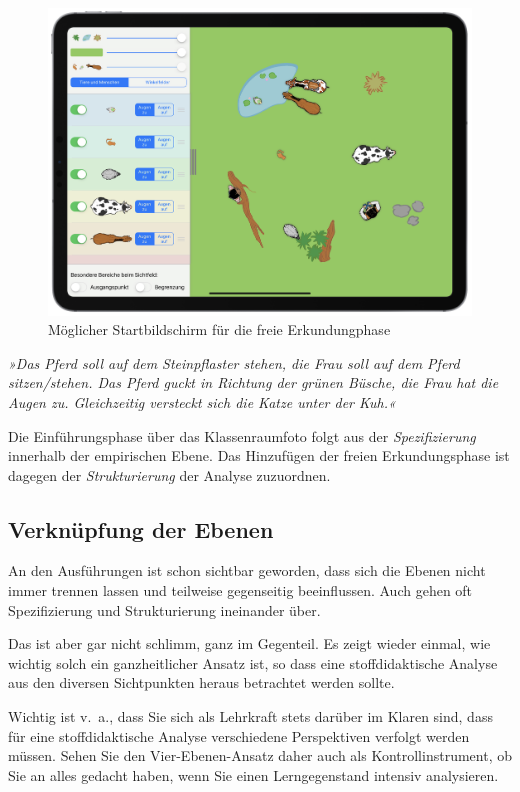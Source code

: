 \documentclass[
]{scrbook}
\theoremstyle{definition}
\theoremstyle{definition}
\theoremstyle{definition}
\theoremstyle{definition}
\theoremstyle{remark}
\begin{document}
\begin{figure}

{\centering \includegraphics[width=0.75\linewidth]{pictures/1-WinkelfarmStart} 

}

\caption{Möglicher Startbildschirm für die freie Erkundungphase}\label{fig:WinkelfarmStart}
\end{figure}

\emph{»Das Pferd soll auf dem Steinpflaster stehen, die Frau soll auf dem Pferd sitzen/stehen. Das Pferd guckt in Richtung der grünen Büsche, die Frau hat die Augen zu. Gleichzeitig versteckt sich die Katze unter der Kuh.«}

Die Einführungsphase über das Klassenraumfoto folgt aus der \emph{Spezifizierung} innerhalb der empirischen Ebene. Das Hinzufügen der freien Erkundungsphase ist dagegen der \emph{Strukturierung} der Analyse zuzuordnen.

\subsection{Verknüpfung der Ebenen}\label{verknuxfcpfung-der-ebenen}

An den Ausführungen ist schon sichtbar geworden, dass sich die Ebenen nicht immer trennen lassen und teilweise gegenseitig beeinflussen. Auch gehen oft Spezifizierung und Strukturierung ineinander über.

Das ist aber gar nicht schlimm, ganz im Gegenteil. Es zeigt wieder einmal, wie wichtig solch ein ganzheitlicher Ansatz ist, so dass eine stoffdidaktische Analyse aus den diversen Sichtpunkten heraus betrachtet werden sollte.

Wichtig ist v.~a., dass Sie sich als Lehrkraft stets darüber im Klaren sind, dass für eine stoffdidaktische Analyse verschiedene Perspektiven verfolgt werden müssen. Sehen Sie den Vier-Ebenen-Ansatz daher auch als Kontrollinstrument, ob Sie an alles gedacht haben, wenn Sie einen Lerngegenstand intensiv analysieren.
\end{document}
